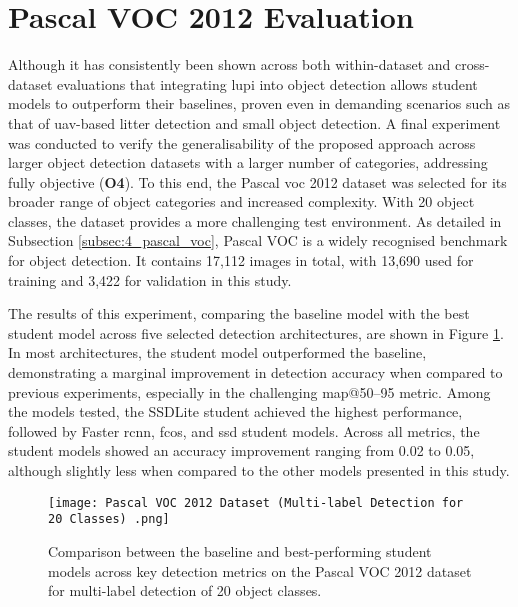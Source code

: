 \section{Pascal VOC 2012 Evaluation}
\label{sec:5_pascal_voc_dataset_exp}

Although it has consistently been shown across both within-dataset and cross-dataset evaluations that integrating \gls{lupi} into object detection allows student models to outperform their baselines, proven even in demanding scenarios such as that of \gls{uav}-based litter detection and small object detection. A final experiment was conducted to verify the generalisability of the proposed approach across larger object detection datasets with a larger number of categories, addressing fully objective (\textbf{O4}). To this end, the Pascal \gls{voc} 2012 dataset was selected for its broader range of object categories and increased complexity. With 20 object classes, the dataset provides a more challenging test environment. As detailed in Subsection \ref{subsec:4_pascal_voc}, Pascal VOC is a widely recognised benchmark for object detection. It contains 17,112 images in total, with 13,690 used for training and 3,422 for validation in this study.

The results of this experiment, comparing the baseline model with the best student model across five selected detection architectures, are shown in Figure \ref{fig:pascal_voc_bar}. In most architectures, the student model outperformed the baseline, demonstrating a marginal improvement in detection accuracy when compared to previous experiments, especially in the challenging \gls{map}@50–95 metric. Among the models tested, the SSDLite student achieved the highest performance, followed by Faster \gls{rcnn}, \gls{fcos}, and \gls{ssd} student models. Across all metrics, the student models showed an accuracy improvement ranging from 0.02 to 0.05, although slightly less when compared to the other models presented in this study.

\begin{figure}[!htbp]
    \centering
    \texttt{[image: Pascal VOC 2012 Dataset (Multi-label Detection for 20 Classes) .png]}
    \caption{Comparison between the baseline and best-performing student models across key detection metrics on the Pascal VOC 2012 dataset for multi-label detection of 20 object classes.}
    \label{fig:pascal_voc_bar}
\end{figure}


